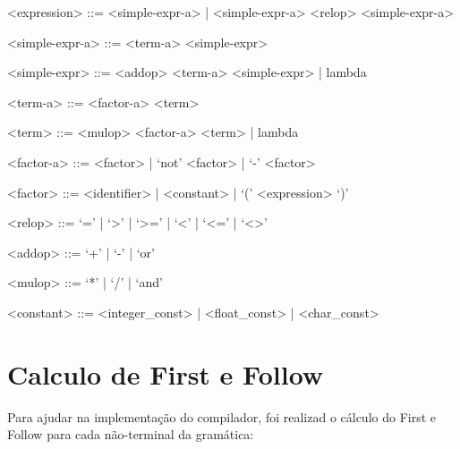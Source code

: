\begin{grammar}
    <expression> ::= <simple-expr-a> | <simple-expr-a> <relop> <simple-expr-a>
    
    <simple-expr-a> ::= <term-a> <simple-expr>

    <simple-expr> ::= <addop> <term-a> <simple-expr> | lambda
    
    <term-a> ::= <factor-a> <term>

    <term> ::= <mulop> <factor-a> <term> | lambda
    
    <factor-a> ::= <factor> | `not' <factor> | `-' <factor>
    
    <factor> ::= <identifier> | <constant> | `(' <expression> `)'
    
    <relop> ::= `=' | `>' | `>=' | `<' | `<=' | `<>'
    
    <addop> ::= `+' | `-' | `or'
    
    <mulop> ::= `*' | `/' | `and'
    
    <constant> ::= <integer_const> | <float_const> | <char_const>
    
    \end{grammar}

\section{Calculo de First e Follow}
\label{sec:sintaticoFirstFollow}

Para ajudar na implementação do compilador, foi realizad o cálculo do First e Follow para cada não-terminal da gramática:

